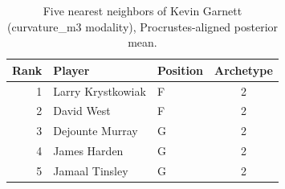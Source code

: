 \begin{table}[htbp]
  \centering\small
  \begin{tabular}{rllc}
    \toprule
    Rank & Player & Position & Archetype \\
    \midrule
    1 & Larry Krystkowiak & F & 2 \\
    2 & David West & F & 2 \\
    3 & Dejounte Murray & G & 2 \\
    4 & James Harden & G & 2 \\
    5 & Jamaal Tinsley & G & 2 \\
    \bottomrule
  \end{tabular}
  \caption{Five nearest neighbors of Kevin Garnett (curvature_m3 modality), Procrustes-aligned posterior mean.}
  \label{tab:Kevin_Garnett_neighbors_curvature_m3}
\end{table}

